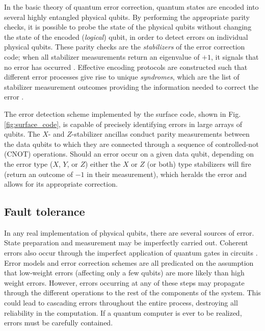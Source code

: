 In the basic theory of quantum error correction, quantum states are encoded into
several highly entangled physical qubits. By performing the appropriate parity
checks, it is possible to probe the state of the physical qubits without
changing the state of the encoded (\textit{logical}) qubit, in order to detect
errors on individual physical qubits. These parity checks are the
\textit{stabilizers} of the error correction code; when all stabilizer
measurements return an eigenvalue of $+1$, it signals that no error has occurred
\cite{nielsen_chuang_2010}. Effective encoding protocols are constructed such
that different error processes give rise to unique \textit{syndromes}, which
are the list of stabilizer measurement outcomes providing the information
needed to correct the error \cite{fowler12_surfac_codes}.

The error detection scheme implemented by the surface code, shown in Fig.
\ref{fig:surface_code}, is capable of precisely identifying errors in large
arrays of qubits. The $X$- and $Z$-stabilizer ancillas conduct parity
measurements between the data qubits to which they are connected through a
sequence of controlled-not (CNOT) operations. Should an error occur on a given
data qubit, depending on the error type ($X$, $Y$, or $Z$) either the $X$ or $Z$
(or both) type stabilizers will fire (return an outcome of $-1$ in their
measurement), which heralds the error and allows for its appropriate correction.

\subsection{Fault tolerance}
In any real implementation of physical qubits, there are several sources of
error. State preparation and measurement may be imperfectly carried out.
Coherent errors also occur through the imperfect application of quantum gates in
circuits \cite{Devitt_2013}. Error models and error correction schemes are all
predicated on the assumption that low-weight errors (affecting only a few
qubits) are more likely than high weight errors. However, errors occurring at
any of these steps may propagate through the different operations to the rest of
the components of the system. This could lead to cascading errors throughout the
entire process, destroying all reliability in the computation. If a quantum
computer is ever to be realized, errors must be carefully contained.

